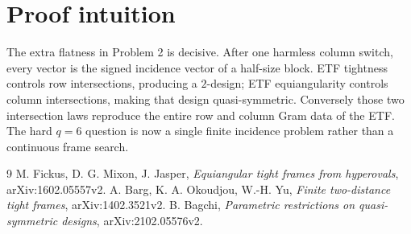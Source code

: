 \documentclass[10pt]{article}
\begin{document}
\section*{Proof intuition}

The extra flatness in Problem 2 is decisive.  After one harmless column
switch, every vector is the signed incidence vector of a half-size block.
ETF tightness controls row intersections, producing a $2$-design; ETF
equiangularity controls column intersections, making that design
quasi-symmetric.  Conversely those two intersection laws reproduce the entire
row and column Gram data of the ETF.  The hard $q=6$ question is now a single
finite incidence problem rather than a continuous frame search.

\begin{thebibliography}{9}
 M. Fickus, D. G. Mixon, J. Jasper,
\emph{Equiangular tight frames from hyperovals}, arXiv:1602.05557v2.
 A. Barg, K. A. Okoudjou, W.-H. Yu,
\emph{Finite two-distance tight frames}, arXiv:1402.3521v2.
 B. Bagchi,
\emph{Parametric restrictions on quasi-symmetric designs},
arXiv:2102.05576v2.
\end{thebibliography}
\end{document}
